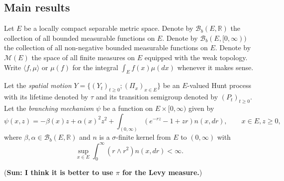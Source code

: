 \documentclass[12pt,a4paper]{amsart}
\numberwithin{equation}{section}
\theoremstyle{plain}
\theoremstyle{definition}
\begin{document}
\subsection{Main results}
\label{sec:main-results}
Let $E$ be a locally compact separable metric space. 
Denote by $\mathcal B_b(E,\mathbb R)$ the collection of all bounded measurable functions on
$E$. 
Denote by $\mathcal B_b(E, [0,\infty))$ the collection of all non-negative bounded measurable functions on $E$. 
Denote by $\mathcal M(E)$ the space of all finite measures on $E$ equipped with the weak topology. 
Write $\langle f,\mu\rangle$ or $\mu(f)$ for the integral $\int_E f(x)\mu(dx)$ whenever it makes sense.

Let the \emph{spatial motion} $Y=\{(Y_t)_{t\geq 0};(\Pi_x)_{x\in E}\}$ be an $E$-valued Hunt process with its lifetime denoted by $\tau$ and its transition semigroup denoted by $(P_t)_{t\geq
  0}$. 
Let the \emph{branching mechanism} $\psi$ be a function on $E\times[0,\infty)$ given by
\[
	\psi(x,z)
	=-\beta(x)z + \alpha(x)^2 z^2+ \int_{(0,\infty)} (e^{-rz}-1+zr )n(x, dr),\qquad x\in E, z\geq0,
\]
where $\beta, \alpha\in \mathcal B_b(E,\mathbb R)$ and $n$ is a $\sigma$-finite kernel from $E$ to $(0,\infty)$ with
\[
	\sup_{x\in E}\int_0^\infty (r\wedge r^2)n(x,dr)
	<\infty.
\]

({\bf Sun: I think it is better to use $\pi$ for the Levy measure.})
\end{document}
